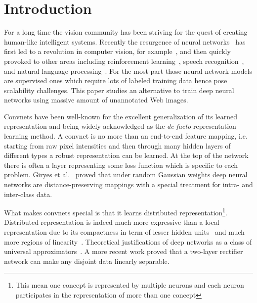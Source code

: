 \documentclass[preprint,12pt]{elsarticle}
\begin{document}
\section{Introduction}\label{sec:intro} %
\noindent For a long time the vision community has been striving for the quest of creating human-like intelligent systems. Recently the resurgence of neural networks~\cite{DBLP:conf/ijcai/Hinton05,DBLP:journals/neco/HintonOT06,bengio2007greedy} has first led to a revolution in computer vision, for example~\cite{DBLP:journals/nn/CiresanMMS12,DBLP:conf/nips/KrizhevskySH12,DBLP:journals/corr/SimonyanZ14a,DBLP:journals/corr/SzegedyLJSRAEVR14,razavian2014cnn}, and then quickly provoked to other areas including reinforcement learning~\cite{DBLP:journals/corr/MnihKSGAWR13}, speech recognition~\cite{DBLP:conf/icassp/GravesMH13}, and natural language processing~\cite{DBLP:conf/nips/MikolovSCCD13}. For the most part those neural network models are supervised ones which require lots of labeled training data hence pose scalability challenges. This paper studies an alternative to train deep neural networks using massive amount of unannotated Web images.

Convnets have been well-known for the excellent generalization of its learned representation and being widely acknowledged as the \emph{de facto} representation learning method. A convnet is no more than an end-to-end feature mapping, i.e. starting from raw pixel intensities and then through many hidden layers of different types a robust representation can be learned. At the top of the network there is often a layer representing some loss function which is specific to each problem.  Giryes et al.~\cite{DBLP:journals/corr/GiryesSB15} proved that under random Gaussian weights deep neural networks are distance-preserving mappings with a special treatment for intra- and inter-class data.  

What makes convnets special is that it learns distributed representation\footnote{ This mean one concept is represented by multiple neurons and each neuron participates in the representation of more than one concept}. Distributed representation is indeed much more expressive than a local representation due to its compactness in term of lesser hidden units~\cite{DBLP:conf/nips/DelalleauB11} and much more regions of linearity~\cite{DBLP:conf/nips/MontufarPCB14}. Theoretical justifications of deep networks as a class of universal approximators~\cite{DBLP:journals/mcss/Cybenko92,DBLP:journals/nn/HornikSW89}. A more recent work \cite{DBLP:conf/icml/AnBB15} proved that a two-layer rectifier network can make any disjoint data linearly separable. 
\end{document}

